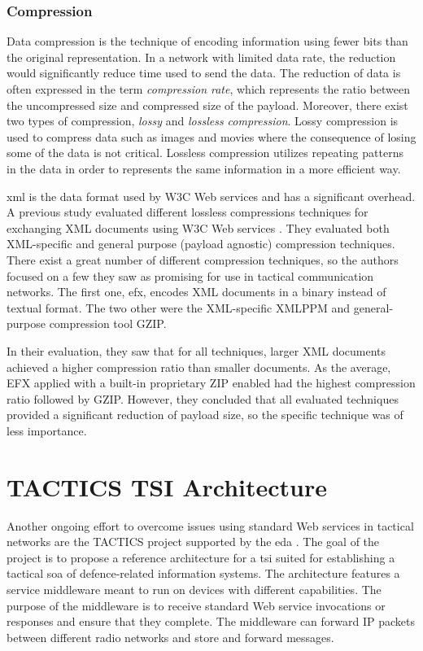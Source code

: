 \subsubsection{Compression}

Data compression is the technique of encoding information using fewer bits than
the original representation. In a network with limited data rate, the reduction
would significantly reduce time used to send the data. The reduction of data is
often expressed in the term \textit{compression rate}, which represents the
ratio between the uncompressed size and compressed size of the payload.
Moreover, there exist two types of compression, \textit{lossy} and
\textit{lossless compression}. Lossy compression is used to compress data such
as images and movies where the consequence of losing some of the data is not
critical. Lossless compression utilizes repeating patterns in the data in order
to represents the same information in a more efficient way.

\gls{xml} is the data format used by W3C Web services and has a significant
overhead. A previous study evaluated different lossless compressions techniques
for exchanging XML documents using W3C Web services \cite{johnsen-compression}.
They evaluated both XML-specific and general purpose (payload agnostic)
compression techniques. There exist a great number of different compression
techniques, so the authors focused on a few they saw as promising for use in
tactical communication networks. The first one, \gls{efx}, encodes XML documents
in a binary instead of textual format. The two other were the XML-specific XMLPPM
and general-purpose compression tool GZIP.

In their evaluation, they saw that for all techniques, larger XML documents
achieved a higher compression ratio than smaller documents. As the average, EFX
applied with a built-in proprietary ZIP enabled had the highest compression
ratio followed by GZIP. However, they concluded that all evaluated techniques
provided a significant reduction of payload size, so the specific technique was
of less importance.

\section{TACTICS TSI Architecture}

Another ongoing effort to overcome issues using standard Web services in
tactical networks are the TACTICS project supported by the \gls{eda}
\cite{tactics-diefenbach}. The goal of the project is to propose a reference
architecture for a \gls{tsi} suited for establishing a tactical \gls{soa} of
defence-related information systems. The architecture features a service
middleware meant to run on devices with different capabilities. The purpose of
the middleware is to receive standard Web service invocations or responses and
ensure that they complete. The middleware can forward IP packets between
different radio networks and store and forward messages.

